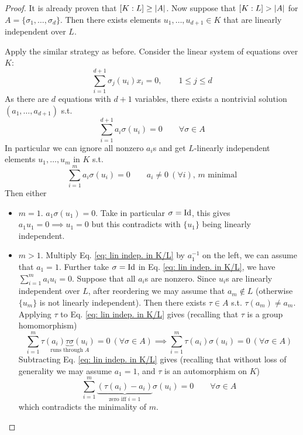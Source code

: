 \documentclass{article}
\begin{document}
\begin{proof}
    It is already proven that $[K : L] \geq \left|A\right|$. Now suppose that $[K : L] > \left|A\right|$ for $A = \{\sigma_1, \dots, \sigma_d\}$. Then there exists elements $u_1, \dots, u_{d+1} \in K$ that are linearly independent over $L$. 

    Apply the similar strategy as before. Consider the linear system of equations over $K$: 
    \[
        \sum_{i = 1}^{d+1} \sigma_j(u_i) x_i = 0, \qquad 1 \leq j \leq d
    \]
    As there are $d$ equations with $d+1$ variables, there exists a nontrivial solution $(a_1, \dots, a_{d+1})$ s.t.
    \[
        \sum_{i = 1}^{d+1} a_i \sigma(u_i) = 0 \qquad \forall \sigma \in A
    \]
    In particular we can ignore all nonzero $a_i$s and get $L$-linearly independent elements $u_1, \dots, u_m$ in $K$ s.t. 
    \begin{equation}\tag{$\ast$}\label{eq: lin indep. in K/L}
        \sum_{i = 1}^m a_i\sigma(u_i) = 0 \qquad \text{$a_i \neq 0\ (\forall i)$, $m$ minimal}
    \end{equation}
    Then either
    \begin{itemize}
        \item $m = 1$. $a_1 \sigma(u_1) = 0$. Take in particular $\sigma = \mathrm{Id}$, this gives $a_1 u_1 = 0 \implies u_1 = 0$ but this contradicts with $\{u_1\}$ being linearly independent. 
        \item $m > 1$. Multiply Eq. \eqref{eq: lin indep. in K/L} by $a_1^{-1}$ on the left, we can assume that $a_1 = 1$. Further take $\sigma = \mathrm{Id}$ in Eq. \eqref{eq: lin indep. in K/L}, we have $\sum_{i = 1}^m a_i u_i = 0$. Suppose that all $a_i$s are nonzero. Since $u_i$s are linearly independent over $L$, after reordering we may assume that $a_m \notin L$ (otherwise $\{u_m\}$ is not linearly independent). Then there exists $\tau \in A$ s.t. $\tau(a_m) \neq a_m$. Applying $\tau$ to Eq. \eqref{eq: lin indep. in K/L} gives (recalling that $\tau$ is a group homomorphism)
        \[
            \sum_{i = 1}^m \tau\underset{\text{runs through $A$}}{(a_i) \underbrace{\tau \sigma}(u_i)} = 0\ (\forall \sigma \in A) \implies \sum_{i = 1}^m \tau(a_i) \sigma(u_i) = 0 \ (\forall \sigma \in A)
        \]
        Subtracting Eq. \eqref{eq: lin indep. in K/L} gives (recalling that without loss of generality we may assume $a_1 = 1$, and $\tau$ is an automorphism on $K$)
        \[
            \sum_{i = 1}^m \underbrace{\left(\tau(a_i) - a_i\right)}_{\text{zero iff $i = 1$}} \sigma(u_i) = 0 \qquad \forall \sigma \in A
        \]
        which contradicts the minimality of $m$. 
    \end{itemize}
\end{proof}
\end{document}

